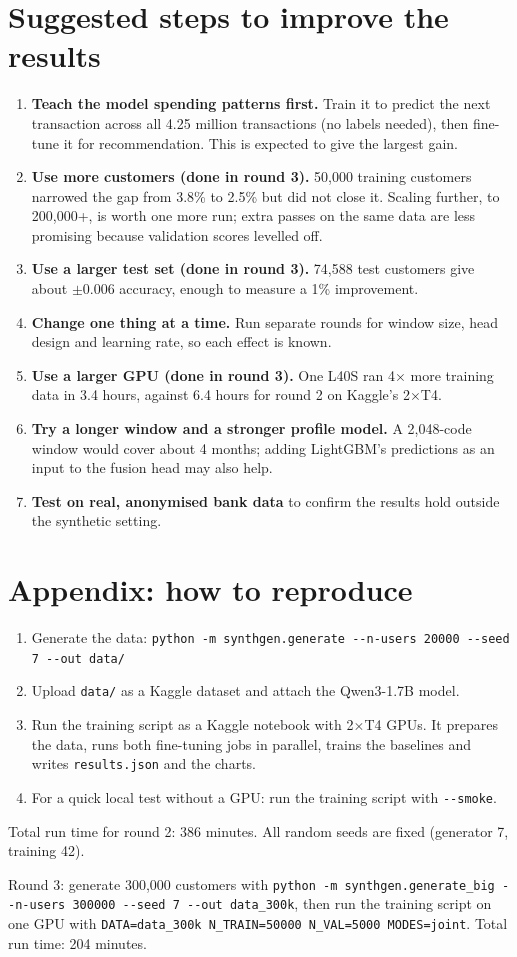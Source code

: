 \documentclass[10pt,a4paper]{article}
\begin{document}
\section{Suggested steps to improve the results}
\begin{enumerate}
\item \textbf{Teach the model spending patterns first.} Train it to predict the next transaction across all 4.25 million transactions (no labels needed), then fine-tune it for recommendation. This is expected to give the largest gain.
\item \textbf{Use more customers (done in round 3).} 50,000 training customers narrowed the gap from 3.8\% to 2.5\% but did not close it. Scaling further, to 200,000+, is worth one more run; extra passes on the same data are less promising because validation scores levelled off.
\item \textbf{Use a larger test set (done in round 3).} 74,588 test customers give about $\pm$0.006 accuracy, enough to measure a 1\% improvement.
\item \textbf{Change one thing at a time.} Run separate rounds for window size, head design and learning rate, so each effect is known.
\item \textbf{Use a larger GPU (done in round 3).} One L40S ran 4$\times$ more training data in 3.4 hours, against 6.4 hours for round 2 on Kaggle's 2$\times$T4.
\item \textbf{Try a longer window and a stronger profile model.} A 2,048-code window would cover about 4 months; adding LightGBM's predictions as an input to the fusion head may also help.
\item \textbf{Test on real, anonymised bank data} to confirm the results hold outside the synthetic setting.
\end{enumerate}

\section*{Appendix: how to reproduce}
\begin{enumerate}
\item Generate the data: \texttt{python -m synthgen.generate -{}-n-users 20000 -{}-seed 7 -{}-out data/}
\item Upload \texttt{data/} as a Kaggle dataset and attach the Qwen3-1.7B model.
\item Run the training script as a Kaggle notebook with 2$\times$T4 GPUs. It prepares the data, runs both fine-tuning jobs in parallel, trains the baselines and writes \texttt{results.json} and the charts.
\item For a quick local test without a GPU: run the training script with \texttt{-{}-smoke}.
\end{enumerate}
Total run time for round 2: 386 minutes. All random seeds are fixed (generator 7, training 42).

Round 3: generate 300,000 customers with \texttt{python -m synthgen.generate\_big -{}-n-users 300000 -{}-seed 7 -{}-out data\_300k}, then run the training script on one GPU with \texttt{DATA=data\_300k N\_TRAIN=50000 N\_VAL=5000 MODES=joint}. Total run time: 204 minutes.
\end{document}
